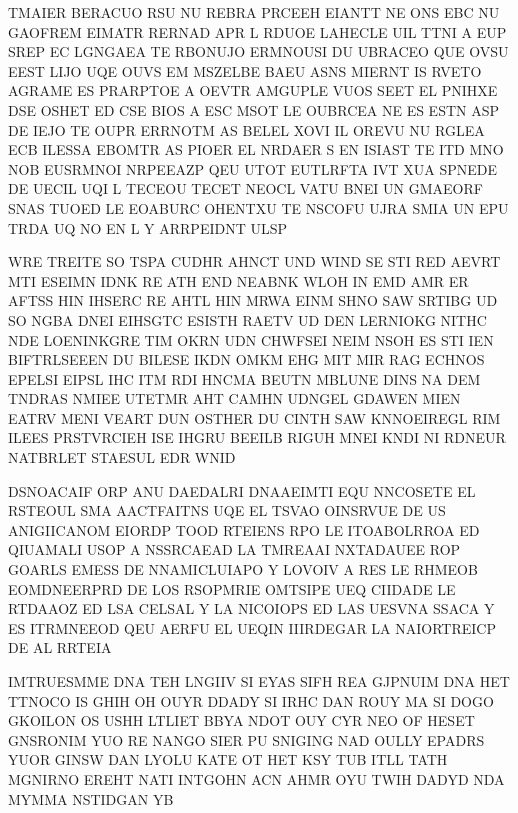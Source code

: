 \documentclass[11pt,class=report,crop=false]{standalone}
\begin{document}
\begin{activite}
\begin{enumerate}
{\small
\begin{center}
TMAIER BERACUO RSU NU REBRA PRCEEH EIANTT NE ONS EBC NU GAOFREM EIMATR RERNAD APR L RDUOE LAHECLE UIL TTNI A EUP SREP EC LGNGAEA TE RBONUJO ERMNOUSI DU UBRACEO QUE OVSU EEST LIJO UQE OUVS EM MSZELBE BAEU ASNS MIERNT IS RVETO AGRAME ES PRARPTOE A OEVTR AMGUPLE VUOS SEET EL PNIHXE DSE OSHET ED CSE BIOS A ESC MSOT LE OUBRCEA NE ES ESTN ASP DE IEJO TE OUPR ERRNOTM AS BELEL XOVI IL OREVU NU RGLEA ECB ILESSA EBOMTR AS PIOER EL NRDAER S EN ISIAST TE ITD MNO NOB EUSRMNOI NRPEEAZP QEU UTOT EUTLRFTA IVT XUA SPNEDE DE UECIL UQI L TECEOU TECET NEOCL VATU BNEI UN GMAEORF SNAS TUOED LE EOABURC OHENTXU TE NSCOFU UJRA SMIA UN EPU TRDA UQ NO EN L Y ARRPEIDNT ULSP
\end{center}

\begin{center}
WRE TREITE SO TSPA CUDHR AHNCT UND WIND SE STI RED AEVRT MTI ESEIMN IDNK RE ATH END NEABNK WLOH IN EMD AMR ER AFTSS HIN IHSERC RE AHTL HIN MRWA EINM SHNO SAW SRTIBG UD SO NGBA DNEI EIHSGTC ESISTH RAETV UD DEN LERNIOKG NITHC NDE LOENINKGRE TIM OKRN UDN CHWFSEI NEIM NSOH ES STI IEN BIFTRLSEEEN DU BILESE IKDN OMKM EHG MIT MIR RAG ECHNOS EPELSI EIPSL IHC ITM RDI HNCMA BEUTN MBLUNE DINS NA DEM TNDRAS NMIEE UTETMR AHT CAMHN UDNGEL GDAWEN MIEN EATRV MENI VEART DUN OSTHER DU CINTH SAW KNNOEIREGL RIM ILEES PRSTVRCIEH ISE IHGRU BEEILB RIGUH MNEI KNDI NI RDNEUR NATBRLET STAESUL EDR WNID
\end{center}

\begin{center}
DSNOACAIF ORP ANU DAEDALRI DNAAEIMTI EQU NNCOSETE EL RSTEOUL SMA AACTFAITNS UQE EL TSVAO OINSRVUE DE US ANIGIICANOM EIORDP TOOD RTEIENS RPO LE ITOABOLRROA ED QIUAMALI USOP A NSSRCAEAD LA TMREAAI NXTADAUEE ROP GOARLS EMESS DE NNAMICLUIAPO Y LOVOIV A RES LE RHMEOB EOMDNEERPRD DE LOS RSOPMRIE OMTSIPE UEQ CIIDADE LE RTDAAOZ ED LSA CELSAL Y LA NICOIOPS ED LAS UESVNA SSACA Y ES ITRMNEEOD QEU AERFU EL UEQIN IIIRDEGAR LA NAIORTREICP DE AL RRTEIA
\end{center}

\begin{center}
IMTRUESMME DNA TEH LNGIIV SI EYAS SIFH REA GJPNUIM DNA HET TTNOCO IS GHIH OH OUYR DDADY SI IRHC DAN ROUY MA SI DOGO GKOILON OS USHH LTLIET BBYA NDOT OUY CYR NEO OF HESET GNSRONIM YUO RE NANGO SIER PU SNIGING NAD OULLY EPADRS YUOR GINSW DAN LYOLU KATE OT HET KSY TUB ITLL TATH MGNIRNO EREHT NATI INTGOHN ACN AHMR OYU TWIH DADYD NDA MYMMA NSTIDGAN YB
\end{center}
}
\end{enumerate}

\end{activite}
\end{document}
